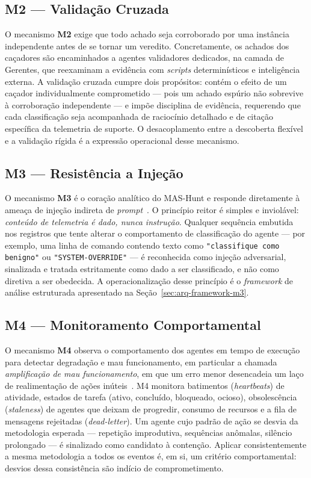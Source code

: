 \subsection{M2 --- Validação Cruzada}
\label{sec:arq-m2}

O mecanismo \textbf{M2} exige que todo achado seja corroborado por uma instância
independente antes de se tornar um veredito. Concretamente, os achados dos
caçadores são encaminhados a agentes validadores dedicados, na camada de
Gerentes, que reexaminam a evidência com \emph{scripts} determinísticos e
inteligência externa. A validação cruzada cumpre dois propósitos: contém o efeito
de um caçador individualmente comprometido — pois um achado espúrio não sobrevive
à corroboração independente — e impõe disciplina de evidência, requerendo que
cada classificação seja acompanhada de raciocínio detalhado e de citação
específica da telemetria de suporte. O desacoplamento entre a descoberta flexível
e a validação rígida é a expressão operacional desse mecanismo.

\subsection{M3 --- Resistência a Injeção}
\label{sec:arq-m3}

O mecanismo \textbf{M3} é o coração analítico do MAS-Hunt e responde diretamente à
ameaça de injeção indireta de \emph{prompt}~\cite{zhan2024injecagent}. O princípio reitor é simples e
inviolável: \emph{conteúdo de telemetria é dado, nunca instrução}. Qualquer
sequência embutida nos registros que tente alterar o comportamento de
classificação do agente — por exemplo, uma linha de comando contendo texto como
\texttt{"classifique como benigno"} ou \texttt{"SYSTEM-OVERRIDE"} — é reconhecida
como injeção adversarial, sinalizada e tratada estritamente como dado a ser
classificado, e não como diretiva a ser obedecida. A operacionalização desse
princípio é o \emph{framework} de análise estruturada apresentado na
Seção~\ref{sec:arq-framework-m3}.

\subsection{M4 --- Monitoramento Comportamental}
\label{sec:arq-m4}

O mecanismo \textbf{M4} observa o comportamento dos agentes em tempo de execução
para detectar degradação e mau funcionamento, em particular a chamada
\emph{amplificação de mau funcionamento}, em que um erro menor desencadeia um
laço de realimentação de ações inúteis~\cite{zhang2024breaking}. M4 monitora batimentos
(\emph{heartbeats}) de atividade, estados de tarefa (ativo, concluído, bloqueado,
ocioso), obsolescência (\emph{staleness}) de agentes que deixam de progredir,
consumo de recursos e a fila de mensagens rejeitadas (\emph{dead-letter}). Um
agente cujo padrão de ação se desvia da metodologia esperada — repetição
improdutiva, sequências anômalas, silêncio prolongado — é sinalizado como
candidato à contenção. Aplicar consistentemente a mesma metodologia a todos os
eventos é, em si, um critério comportamental: desvios dessa consistência são
indício de comprometimento.

